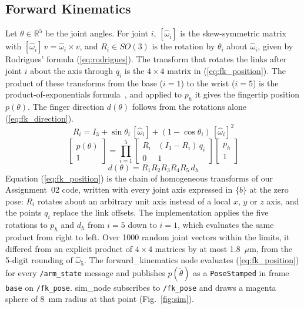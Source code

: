 \documentclass[letterpaper, 10 pt, conference]{ieeeconf}
\begin{document}
\subsection{Forward Kinematics}
\label{sec:fk}
Let $\theta \in \mathbb{R}^5$ be the joint angles. For joint $i$, $[\hat{\omega}_i]$ is the
skew-symmetric matrix with $[\hat{\omega}_i]\,v = \hat{\omega}_i \times v$, and $R_i \in SO(3)$ is the
rotation by $\theta_i$ about $\hat{\omega}_i$, given by Rodrigues' formula (\ref{eq:rodrigues}). The
transform that rotates the links after joint $i$ about the axis through $q_i$ is the $4\times4$ matrix in
(\ref{eq:fk_position}). The product of these transforms from the base ($i = 1$) to the wrist ($i = 5$)
is the product-of-exponentials formula~\cite{c1}, and applied to $p_h$ it gives the fingertip position
$p(\theta)$. The finger direction $d(\theta)$ follows from the rotations alone (\ref{eq:fk_direction}).
\begin{equation}
R_i = I_3 + \sin\theta_i\,[\hat{\omega}_i] + (1-\cos\theta_i)\,[\hat{\omega}_i]^2
\label{eq:rodrigues}
\end{equation}
\begin{equation}
\begin{bmatrix} p(\theta) \\ 1 \end{bmatrix} =
\prod_{i=1}^{5} \begin{bmatrix} R_i & (I_3 - R_i)\,q_i \\ 0 & 1 \end{bmatrix}
\begin{bmatrix} p_h \\ 1 \end{bmatrix}
\label{eq:fk_position}
\end{equation}
\begin{equation}
d(\theta) = R_1 R_2 R_3 R_4 R_5\, d_h
\label{eq:fk_direction}
\end{equation}
Equation (\ref{eq:fk_position}) is the chain of homogeneous transforms of our Assignment~02 code, written with
every joint axis expressed in $\{b\}$ at the zero pose: $R_i$ rotates about an arbitrary unit axis instead of
a local $x$, $y$ or $z$ axis, and the points $q_i$ replace the link offsets. The implementation applies the
five rotations to $p_h$ and $d_h$ from $i = 5$ down to $i = 1$, which evaluates the same product from right
to left. Over 1000 random joint vectors within the limits, it differed from an explicit product of
$4\times4$ matrices by at most 1.8~$\mu$m, from the 5-digit rounding of $\hat{\omega}_5$. The forward\_kinematics node evaluates
(\ref{eq:fk_position}) for every \texttt{/arm\_state} message and publishes $p(\tilde{\theta})$ as a
\texttt{PoseStamped} in frame \texttt{base} on \texttt{/fk\_pose}. sim\_node subscribes to
\texttt{/fk\_pose} and draws a magenta sphere of 8~mm radius at that point (Fig.~\ref{fig:sim}).
\end{document}
